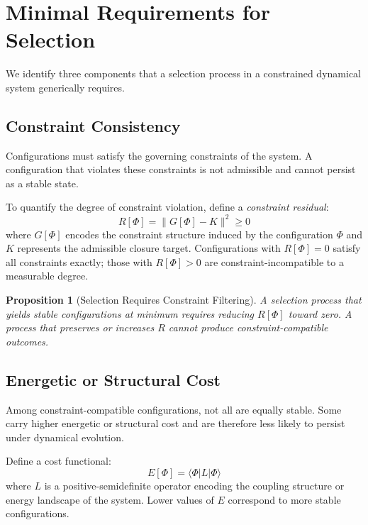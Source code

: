 \documentclass[12pt]{article}
\newtheorem{proposition}[theorem]{Proposition}
\begin{document}
\section{Minimal Requirements for Selection}\label{sec:requirements}

We identify three components that a selection process in a constrained dynamical system generically requires.

\subsection{Constraint Consistency}

Configurations must satisfy the governing constraints of the system. A configuration that violates these constraints is not admissible and cannot persist as a stable state.

To quantify the degree of constraint violation, define a \textit{constraint residual}:
\begin{equation}\label{eq:residual}
    R[\Phi] = \|G[\Phi] - K\|^2 \geq 0
\end{equation}
where $G[\Phi]$ encodes the constraint structure induced by the configuration $\Phi$ and $K$ represents the admissible closure target. Configurations with $R[\Phi] = 0$ satisfy all constraints exactly; those with $R[\Phi] > 0$ are constraint-incompatible to a measurable degree.

\begin{proposition}[Selection Requires Constraint Filtering]
A selection process that yields stable configurations at minimum requires reducing $R[\Phi]$ toward zero. A process that preserves or increases $R$ cannot produce constraint-compatible outcomes.
\end{proposition}

\subsection{Energetic or Structural Cost}

Among constraint-compatible configurations, not all are equally stable. Some carry higher energetic or structural cost and are therefore less likely to persist under dynamical evolution.

Define a cost functional:
\begin{equation}\label{eq:energy}
    E[\Phi] = \langle \Phi | L | \Phi \rangle
\end{equation}
where $L$ is a positive-semidefinite operator encoding the coupling structure or energy landscape of the system. Lower values of $E$ correspond to more stable configurations.
\end{document}
